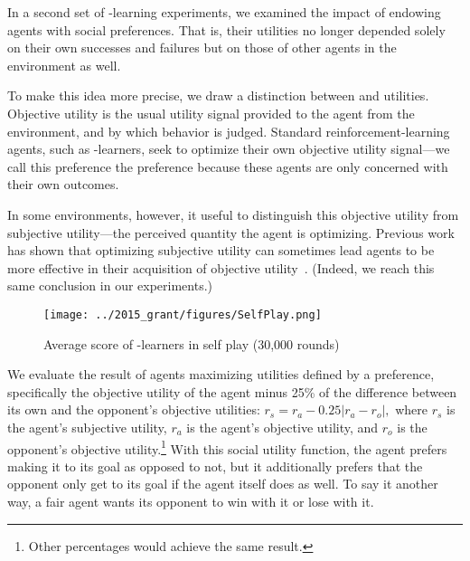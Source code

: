 
In a second set of \Q-learning experiments, we examined the impact of
endowing agents with social preferences. That is, their
utilities no longer depended solely on their own successes and
failures but on those of other agents in the environment as
well.

To make this idea more precise, we draw a distinction
between  and  utilities.  Objective
utility is the usual utility signal provided to the agent from the
environment, and by which behavior is judged.
Standard reinforcement-learning agents, such as \Q-learners, seek to
optimize their own objective utility signal---we call this preference
the  preference because these agents are only concerned
with their own outcomes.

In some environments, however, it useful to distinguish this objective
utility from subjective utility---the perceived quantity the agent is
optimizing. Previous work has shown that optimizing subjective utility
can sometimes lead agents to be more effective in their acquisition of
objective utility~\cite{singh2009rewards}.  (Indeed, we reach this same
conclusion in our experiments.)


\begin{wrapfigure}{l}{0.325\textwidth}
\texttt{[image: ../2015\_grant/figures/SelfPlay.png]}
\caption{Average score of \Q-learners in self play (30,000 rounds)}
\label{f:selfplay}
\end{wrapfigure}

We evaluate the result of agents maximizing utilities defined
by a  preference, specifically the objective utility
of the agent minus 25\% of the difference between its own and the
opponent's objective utilities: $r_{s} = r_{a} - 0.25 \left| r_{a} -
r_{o} \right|,$ where $r_{s}$ is the agent's subjective utility,
$r_{a}$ is the agent's objective utility, and $r_{o}$ is the opponent's
objective utility.\footnote{Other percentages would achieve the same
result.}  
With this social utility function, the agent prefers making it to its
goal as opposed to not, but it additionally prefers that the opponent
only get to its goal if the agent itself does as well. To say it
another way, a fair agent wants its opponent to win with it or lose
with it.

